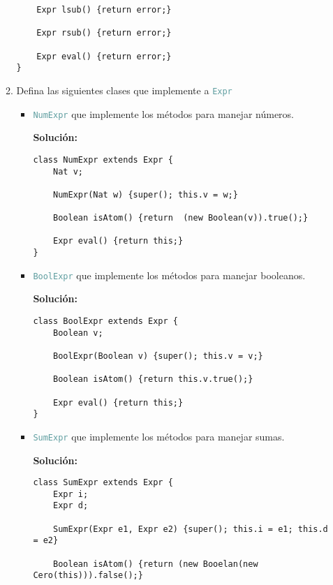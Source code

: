 \documentclass{article}
\newcommand{\tp}[1]{\textcolor{CadetBlue} {\texttt{#1}}}
\newcommand{\tb}[1]{\textcolor{RoyalPurple} {\textbf{#1}}}
\begin{document}
\begin{enumerate}
\begin{enumerate}
\begin{verbatim}
    Expr lsub() {return error;}

    Expr rsub() {return error;}

    Expr eval() {return error;}
}
            \end{verbatim}

            \item Defina las siguientes clases que implemente a \tp{Expr}

            \begin{itemize}
                \item \tp{NumExpr} que implemente los métodos para manejar
                números.

                \tb{Solución:}

                \begin{verbatim}
class NumExpr extends Expr {
    Nat v;

    NumExpr(Nat w) {super(); this.v = w;}

    Boolean isAtom() {return  (new Boolean(v)).true();}

    Expr eval() {return this;}
}
                \end{verbatim}

                \item \tp{BoolExpr} que implemente los métodos para manejar
                booleanos.

                \tb{Solución:}

                \begin{verbatim}
class BoolExpr extends Expr {
    Boolean v;

    BoolExpr(Boolean v) {super(); this.v = v;}

    Boolean isAtom() {return this.v.true();}

    Expr eval() {return this;}
}
                \end{verbatim}

                \item \tp{SumExpr} que implemente los métodos para manejar
                sumas.

                \tb{Solución:}

                \begin{verbatim}
class SumExpr extends Expr {
    Expr i;
    Expr d;

    SumExpr(Expr e1, Expr e2) {super(); this.i = e1; this.d = e2}

    Boolean isAtom() {return (new Booelan(new Cero(this))).false();}


\end{verbatim}
\end{itemize}
\end{enumerate}
\end{enumerate}
\end{document}
